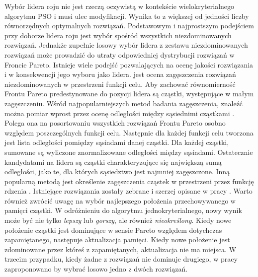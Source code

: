 Wybór lidera roju nie jest rzeczą oczywistą w kontekście wielokryterialnego algorytmu PSO i musi ulec modyfikacji. Wynika to z większej od jedności liczby równorzędnych optymalnych rozwiązań. Podstawowym i najprostszym podejściem przy doborze lidera roju jest wybór spośród wszystkich niezdominowanych rozwiązań. Jednakże zupełnie losowy wybór lidera z zestawu niezdominowanych rozwiązań może prowadzić do utraty odpowiedniej dystrybucji rozwiązań w Froncie Pareto. Istnieje wiele podejść pozwalających na ocenę jakości rozwiązania i w konsekwencji jego wyboru jako lidera.  jest ocena zagęszczenia rozwiązań niezdominowanych w przestrzeni funkcji celu. Aby zachować równomierność Frontu Pareto predestynowane do pozycji lidera są cząstki, występujące w małym zagęszczeniu. Wśród najpopularniejszych metod badania zagęszczenia, znaleźć można pomiar wprost przez ocenę odległości między sąsiednimi cząstkami \parencite{Deb2002}. Polega ona na posortowaniu wszystkich rozwiązań Frontu Pareto osobno względem poszczególnych funkcji celu. Następnie dla każdej funkcji celu tworzona jest lista odległości pomiędzy sąsiadami danej cząstki. Dla każdej cząstki, sumowane są wyliczone znormalizowane odległości między sąsiadami. Ostatecznie kandydatami na lidera są cząstki charakteryzujące się największą sumą odległości, jako te, dla których sąsiedztwo jest najmniej zagęszczone. Inną popularną metodą jest określenie zagęszczenia cząstek w przestrzeni przez funkcję rdzenia \parencite{Deb1989}. Istniejące rozwiązania zostały zebrane i szerzej opisane w pracy \parencite{CoelloCoello2006}. Warto również zwrócić uwagę na wybór najlepszego położenia przechowywanego w pamięci cząstki. W odróżnieniu do algorytmu jednokryterialnego, nowy wynik może być nie tylko \textit{lepszy} lub \textit{gorszy}, ale również \textit{nieokreślony}. Kiedy nowe położenie cząstki jest dominujące w sensie Pareto względem dotychczas zapamiętanego, następuje aktualizacja pamięci. Kiedy nowe położenie jest zdominowane przez któreś z zapamiętanych, aktualizacja nie ma miejsca. W trzecim przypadku, kiedy żadne z rozwiązań nie dominuje drugiego, w pracy \cite{CoelloCoello2002} zaproponowano by wybrać losowo jedno z dwóch rozwiązań.

